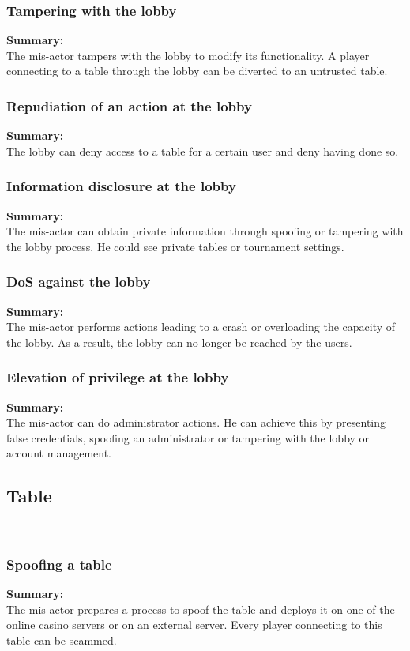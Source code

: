 \documentclass[a4paper,11pt]{report}
\begin{document}
\subsubsection{Tampering with the lobby}
\label{LobbyCasesT}
\textbf{Summary:} \\
The mis-actor tampers with the lobby to modify its functionality. A player connecting to a table through the lobby can be diverted to an untrusted table.
\subsubsection{Repudiation of an action at the lobby}
\label{LobbyCasesR}
\textbf{Summary:} \\
The lobby can deny access to a table for a certain user and deny having done so.

\subsubsection{Information disclosure at the lobby}
\label{LobbyCasesI}
\textbf{Summary:} \\
The mis-actor can obtain private information through spoofing or tampering with the lobby process. He could see private tables or tournament settings.

\subsubsection{DoS against the lobby}
\label{LobbyCasesD}
\textbf{Summary:} \\
The mis-actor performs actions leading to a crash or overloading the capacity of the lobby. As a result, the lobby can no longer be reached by the users.

\subsubsection{Elevation of privilege at the lobby}
\label{LobbyCasesE}
\textbf{Summary:} \\
The mis-actor can do administrator actions. He can achieve this by presenting false credentials, spoofing an administrator or tampering with the lobby or account management.

\subsection{Table}\
\label{TableCases}
\subsubsection{Spoofing a table}
\label{TableCasesS}
\textbf{Summary:} \\
The mis-actor prepares a process to spoof the table and deploys it on one of the online casino servers or on an external server. Every player connecting to this table can be scammed.
\end{document}
